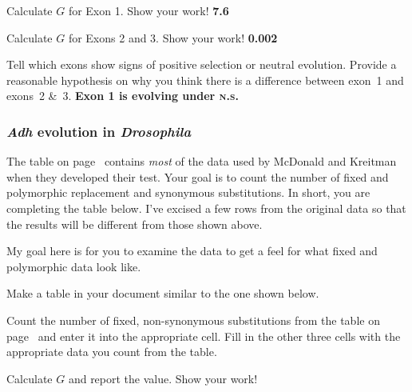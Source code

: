 \documentclass[12pt, addpoints, hidelinks]{exam}
\begin{document}
\begin{questions}

\question[5] Calculate $G$ for Exon 1. Show your work!
\ifprintanswers \textbf{7.6} \fi

\question[5] Calculate $G$ for Exons 2 and 3. Show your work!
\ifprintanswers \textbf{0.002} \fi

\question[5] Tell which exons show signs of positive selection or neutral evolution. Provide a reasonable hypothesis on why you think there is a difference between exon~1 and exons~2 \&~3.
\ifprintanswers \textbf{Exon 1 is evolving under \textsc{n.s.}} \fi

%
%
%

\subsubsection*{\textit{Adh} evolution in \textit{Drosophila}}

The table on page~\pageref{mk_data} contains \emph{most} of the data used by McDonald and Kreitman when they developed their test. Your goal is to count the number of fixed and polymorphic replacement and synonymous substitutions. In short, you are completing the table below. I've excised a few rows from the original data so that the results will be different from those shown above.

My goal here is for you to examine the data to get a feel for what fixed and polymorphic data look like. 

\question Make a table in your document similar to the one shown below.

\question[5] Count the number of fixed, non-synonymous substitutions from the table on page~\pageref{mk_data} and enter it into the appropriate cell. Fill in the other three cells with the appropriate data you count from the table.

\question[5] Calculate $G$ and report the value. Show your work!

\end{questions}
\end{document}
